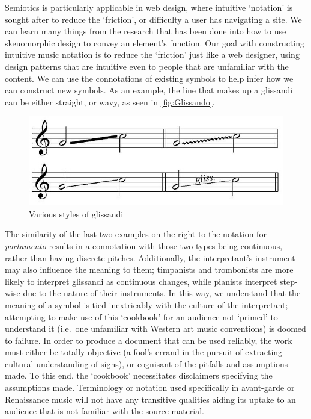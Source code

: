 Semiotics is particularly applicable in web design, where intuitive `notation' is sought after to reduce the `friction', or difficulty a user has navigating a site.
We can learn many things from the research that has been done into how to use skeuomorphic design to convey an element's function.
Our goal with constructing intuitive music notation is to reduce the `friction' just like a web designer, using design patterns that are intuitive even to people that are unfamiliar with the content.
We can use the connotations of existing symbols to help infer how we can construct new symbols.
As an example, the line that makes up a glissandi can be either straight, or wavy, as seen in \autoref{fig:Glissando}.
\begin{figure}
    \includegraphics[]{./resources/glissando.jpg}
\caption{Various styles of glissandi}\label{fig:Glissando}
\end{figure}
The similarity of the last two examples on the right to the notation for \emph{portamento} results in a connotation with those two types being continuous, rather than having discrete pitches.
Additionally, the interpretant's instrument may also influence the meaning to them; timpanists and trombonists are more likely to interpret glissandi as continuous changes, while pianists interpret step-wise due to the nature of their instruments.
In this way, we understand that the meaning of a symbol is tied inextricably with the culture of the interpretant; attempting to make use of this `cookbook' for an audience not `primed' to understand it (i.e.\ one unfamiliar with Western art music conventions) is doomed to failure.
In order to produce a document that can be used reliably, the work must either be totally objective (a fool's errand in the pursuit of extracting cultural understanding of signs), or cognisant of the pitfalls and assumptions made.
To this end, the `cookbook' necessitates disclaimers specifying the assumptions made.
Terminology or notation used specifically in avant-garde or Renaissance music will not have any transitive qualities aiding its uptake to an audience that is not familiar with the source material.

